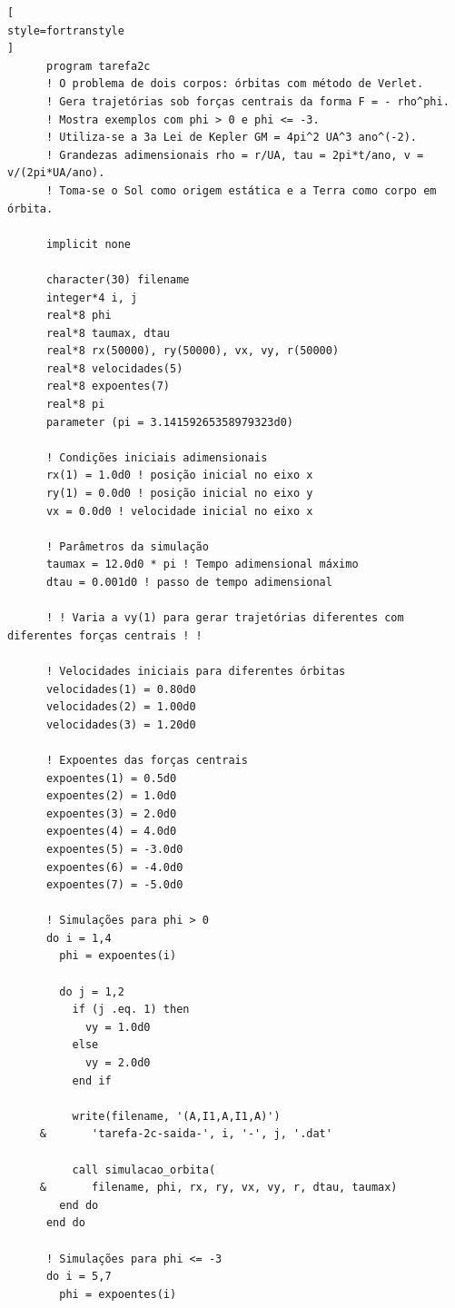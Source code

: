 \documentclass[12pt,a4paper]{article}
\begin{document}
\begin{lstlisting}[
style=fortranstyle
]
      program tarefa2c
      ! O problema de dois corpos: órbitas com método de Verlet.
      ! Gera trajetórias sob forças centrais da forma F = - rho^phi.
      ! Mostra exemplos com phi > 0 e phi <= -3.
      ! Utiliza-se a 3a Lei de Kepler GM = 4pi^2 UA^3 ano^(-2).
      ! Grandezas adimensionais rho = r/UA, tau = 2pi*t/ano, v = v/(2pi*UA/ano).
      ! Toma-se o Sol como origem estática e a Terra como corpo em órbita.

      implicit none

      character(30) filename
      integer*4 i, j
      real*8 phi
      real*8 taumax, dtau
      real*8 rx(50000), ry(50000), vx, vy, r(50000)
      real*8 velocidades(5)
      real*8 expoentes(7)
      real*8 pi
      parameter (pi = 3.14159265358979323d0)

      ! Condições iniciais adimensionais
      rx(1) = 1.0d0 ! posição inicial no eixo x
      ry(1) = 0.0d0 ! posição inicial no eixo y
      vx = 0.0d0 ! velocidade inicial no eixo x

      ! Parâmetros da simulação
      taumax = 12.0d0 * pi ! Tempo adimensional máximo
      dtau = 0.001d0 ! passo de tempo adimensional

      ! ! Varia a vy(1) para gerar trajetórias diferentes com diferentes forças centrais ! !

      ! Velocidades iniciais para diferentes órbitas
      velocidades(1) = 0.80d0
      velocidades(2) = 1.00d0
      velocidades(3) = 1.20d0

      ! Expoentes das forças centrais
      expoentes(1) = 0.5d0
      expoentes(2) = 1.0d0
      expoentes(3) = 2.0d0
      expoentes(4) = 4.0d0
      expoentes(5) = -3.0d0
      expoentes(6) = -4.0d0
      expoentes(7) = -5.0d0

      ! Simulações para phi > 0
      do i = 1,4
        phi = expoentes(i)

        do j = 1,2
          if (j .eq. 1) then
            vy = 1.0d0
          else
            vy = 2.0d0
          end if

          write(filename, '(A,I1,A,I1,A)')
     &       'tarefa-2c-saida-', i, '-', j, '.dat'

          call simulacao_orbita(
     &       filename, phi, rx, ry, vx, vy, r, dtau, taumax)
        end do
      end do

      ! Simulações para phi <= -3
      do i = 5,7
        phi = expoentes(i)


\end{lstlisting}
\end{document}
